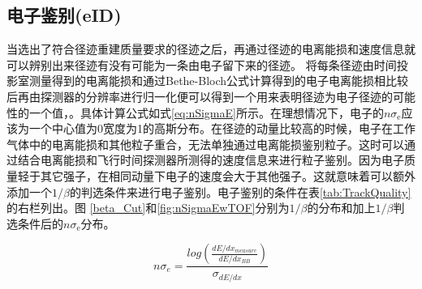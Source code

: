 \subsection{电子鉴别(eID)}
\label{ch:eID}
当选出了符合径迹重建质量要求的径迹之后，再通过径迹的电离能损和速度信息就可以辨别出来径迹有没有可能为一条由电子留下来的径迹。
将每条径迹由时间投影室测量得到的电离能损和通过Bethe-Bloch公式计算得到的电子电离能损相比较后再由探测器的分辨率进行归一化便可以得到一个用来表明径迹为电子径迹的可能性的一个值，\nSigmaE 。具体计算公式如式\ref{eq:nSigmaE}所示。在理想情况下，电子的$n\sigma_\mathrm{e}$应该为一个中心值为0宽度为1的高斯分布。在径迹的动量比较高的时候，电子在工作气体中的电离能损和其他粒子重合，无法单独通过电离能损鉴别粒子。这时可以通过结合电离能损和飞行时间探测器所测得的速度信息来进行粒子鉴别。因为电子质量轻于其它强子，在相同动量下电子的速度会大于其他强子。这就意味着可以额外添加一个$1/\beta$的判选条件来进行电子鉴别。电子鉴别的条件在表\ref{tab:TrackQuality}的右栏列出。图 \ref{beta_Cut}和\ref{fig:nSigmaEwTOF}分别为$1/\beta$的分布和加上$1/\beta$判选条件后的$n\sigma_\mathrm{e}$分布。

\begin{equation}
    \label{eq:nSigmaE}
    n\sigma_e = \frac{log(\frac{dE/dx_{measure}}{dE/dx_{BB}})}{\sigma_{dE/dx}}
\end{equation}

